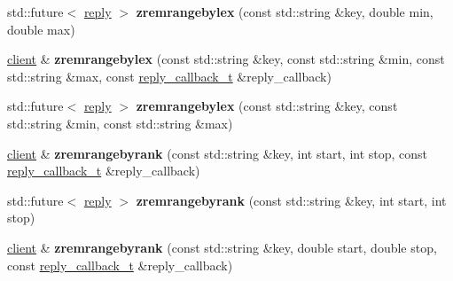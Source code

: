 \begin{DoxyCompactItemize}
\item 
\mbox{\label{classcpp__redis_1_1client_a6ed8333a10d5c4390f3e52f91c436264}} 
std\+::future$<$ \hyperlink{classcpp__redis_1_1reply}{reply} $>$ {\bfseries zremrangebylex} (const std\+::string \&key, double min, double max)
\item 
\mbox{\label{classcpp__redis_1_1client_a8fe114da4df2dfd2ab5240554444a294}} 
\hyperlink{classcpp__redis_1_1client}{client} \& {\bfseries zremrangebylex} (const std\+::string \&key, const std\+::string \&min, const std\+::string \&max, const \hyperlink{classcpp__redis_1_1client_a061a1140d36d2eaeda82b09a0bb3f9f2}{reply\+\_\+callback\+\_\+t} \&reply\+\_\+callback)
\item 
\mbox{\label{classcpp__redis_1_1client_a1350d0df45d5b41c940d782682b41bd9}} 
std\+::future$<$ \hyperlink{classcpp__redis_1_1reply}{reply} $>$ {\bfseries zremrangebylex} (const std\+::string \&key, const std\+::string \&min, const std\+::string \&max)
\item 
\mbox{\label{classcpp__redis_1_1client_af40c1e6895312c13636db9dd610ce753}} 
\hyperlink{classcpp__redis_1_1client}{client} \& {\bfseries zremrangebyrank} (const std\+::string \&key, int start, int stop, const \hyperlink{classcpp__redis_1_1client_a061a1140d36d2eaeda82b09a0bb3f9f2}{reply\+\_\+callback\+\_\+t} \&reply\+\_\+callback)
\item 
\mbox{\label{classcpp__redis_1_1client_acc4f3b77c38c948658505ce04bbbde6d}} 
std\+::future$<$ \hyperlink{classcpp__redis_1_1reply}{reply} $>$ {\bfseries zremrangebyrank} (const std\+::string \&key, int start, int stop)
\item 
\mbox{\label{classcpp__redis_1_1client_a727a7eeae900fc82525544618deaa70b}} 
\hyperlink{classcpp__redis_1_1client}{client} \& {\bfseries zremrangebyrank} (const std\+::string \&key, double start, double stop, const \hyperlink{classcpp__redis_1_1client_a061a1140d36d2eaeda82b09a0bb3f9f2}{reply\+\_\+callback\+\_\+t} \&reply\+\_\+callback)
\item 
\mbox{\label{classcpp__redis_1_1client_a7ad8503cfe002efb2caa36a09791125f}} 

\end{DoxyCompactItemize}
